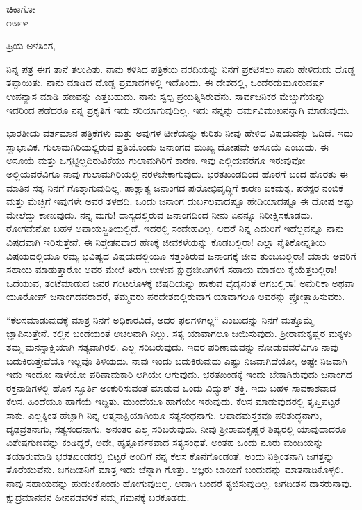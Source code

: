 \vspace{-0.5cm}

\begin{flushright}
ಚಿಕಾಗೋ\\೧೮೯೪
\end{flushright}

\noindent
ಪ್ರಿಯ ಅಳಸಿಂಗ,

ನಿನ್ನ ಪತ್ರ ಈಗ ತಾನೆ ತಲುಪಿತು. ನಾನು ಕಳಿಸಿದ ಪತ್ರಿಕೆಯ ವರದಿಯನ್ನು ನಿನಗೆ ಪ್ರಕಟಿಸಲು ನಾನು ಹೇಳಿದುದು ದೊಡ್ಡ ತಪ್ಪಾಯಿತು. ನಾನು ಮಾಡಿದ ದೊಡ್ಡ ಪ್ರಮಾದಗಳಲ್ಲಿ ಇದೊಂದು. ಈ ದೇಶದಲ್ಲಿ, ಒಂದೆರಡು\enginline{-}ಮೂರುವರ್ಷ ಉಪನ್ಯಾಸ ಮಾಡಿ ಹಣವನ್ನು ಎತ್ತಬಹುದು. ನಾನು ಸ್ವಲ್ಪ ಪ್ರಯತ್ನಿಸಿರುವೆನು. ಸಾರ್ವಜನಿಕರ ಮೆಚ್ಚುಗೆಯನ್ನು ಇದರಿಂದ ಪಡೆದರೂ ನನ್ನ ಪ್ರಕೃತಿಗೆ ಇದು ಸರಿಯಾಗುವುದಿಲ್ಲ. ಇದು ನನ್ನನ್ನು ಧರ್ಮವಿಮುಖನನ್ನಾಗಿ ಮಾಡುವುದು.

ಭಾರತೀಯ ವರ್ತಮಾನ ಪತ್ರಿಕೆಗಳು ಮತ್ತು ಅವುಗಳ ಟೀಕೆಯನ್ನು ಕುರಿತು ನೀವು ಹೇಳಿದ ವಿಷಯವನ್ನು ಓದಿದೆ. ಇದು ಸ್ವಾಭಾವಿಕ. ಗುಲಾಮಗಿರಿಯಲ್ಲಿರುವ ಪ್ರತಿಯೊಂದು ಜನಾಂಗದ ಮುಖ್ಯ ದೋಷವೇ ಅಸೂಯೆ ಎಂಬುದು. ಈ ಅಸೂಯೆ ಮತ್ತು ಒಗ್ಗಟ್ಟಿಲ್ಲದಿರುವಿಕೆಯು ಗುಲಾಮಗಿರಿಗೆ ಕಾರಣ. ಇವು ಎಲ್ಲಿಯವರೆಗೂ ಇರುವುವೋ ಅಲ್ಲಿಯವರೆವಿಗೂ ನಾವು ಗುಲಾಮಗಿರಿಯಲ್ಲಿ ನರಳಬೇಕಾಗುವುದು. ಭರತಖಂಡದಿಂದ ಹೊರಗೆ ಬಂದ ಹೊರತು ಈ ಮಾತಿನ ಸತ್ಯ ನಿನಗೆ ಗೊತ್ತಾಗುವುದಿಲ್ಲ. ಪಾಶ್ಚಾತ್ಯ ಜನಾಂಗದ ಪುರೋಭಿವೃದ್ಧಿಗೆ ಕಾರಣ ಐಕಮತ್ಯ. ಪರಸ್ಪರ ನಂಬಿಕೆ ಮತ್ತು ಮೆಚ್ಚಿಗೆ ಇವುಗಳೇ ಅವರ ತಳಹದಿ. ಒಂದು ಜನಾಂಗ ದುರ್ಬಲವಾದಷ್ಟೂ ಹೇಡಿಯಾದಷ್ಟೂ ಈ ದೋಷ ಅಷ್ಟು ಮೇಲೆದ್ದು ಕಾಣುವುದು. ನನ್ನ ಮಗು! ದಾಸ್ಯದಲ್ಲಿರುವ ಜನಾಂಗದಿಂದ ನೀನು ಏನನ್ನೂ ನಿರೀಕ್ಷಿಸಕೂಡದು. ರೋಗವೇನೋ ಬಹಳ ಅಪಾಯಸ್ಥಿತಿಯಲ್ಲಿದೆ. ಇದರಲ್ಲಿ ಸಂದೇಹವಿಲ್ಲ. ಆದರೆ ನಿನ್ನ ಎದುರಿಗೆ ಇದೆಲ್ಲವನ್ನೂ ನಾನು ವಿಷದವಾಗಿ ಇರಿಸುತ್ತೇನೆ. ಈ ನಿಶ್ಚೇತನವಾದ ಹೆಣಕ್ಕೆ ಜೀವಕಳೆಯನ್ನು ಕೊಡಬಲ್ಲಿರಾ! ಎಲ್ಲಾ ನೈತಿಕೋನ್ನತಿಯ ವಿಷಯದಲ್ಲಿಯೂ ರಮ್ಯ ಭವಿಷ್ಯದ ವಿಷಯದಲ್ಲಿಯೂ ಸತ್ತಂತಿರುವ ಜನಾಂಗಕ್ಕೆ ಜೀವ ತುಂಬಬಲ್ಲಿರಾ! ಯಾರು ಅವರಿಗೆ ಸಹಾಯ ಮಾಡುತ್ತಾರೋ ಅವರ ಮೇಲೆ ತಿರುಗಿ ಬೀಳುವ ಕ್ಷುದ್ರಜೀವಿಗಳಿಗೆ ಸಹಾಯ ಮಾಡಲು ಕೈಯೆತ್ತಬಲ್ಲಿರಾ! ಒದೆಯುವ, ತಂಟೆಮಾಡುವ ಜನರ ಗಂಟಲೊಳಕ್ಕೆ ಔಷಧಿಯನ್ನು ಹಾಕುವ ವೈದ್ಯನಂತೆ ಆಗಬಲ್ಲಿರಾ! ಅಮೆರಿಕಾ ಅಥವಾ ಯೂರೋಪ್ ಜನಾಂಗದವರಾದರೆ, ತಮ್ಮವರು ಪರದೇಶದಲ್ಲಿರುವಾಗ ಯಾವಾಗಲೂ ಅವರನ್ನು ಪ್ರೋತ್ಸಾಹಿಸುವರು.

“ಕೆಲಸಮಾಡುವುದಕ್ಕೆ ಮಾತ್ರ ನಿನಗೆ ಅಧಿಕಾರವಿದೆ, ಅದರ ಫಲಗಳಿಗಲ್ಲ“ ಎಂಬುದನ್ನು ನಿನಗೆ ಮತ್ತೊಮ್ಮೆ ಜ್ಞಾಪಿಸುತ್ತೇನೆ. ಕಲ್ಲಿನ ಬಂಡೆಯಂತೆ ಅಚಲನಾಗಿ ನಿಲ್ಲು. ಸತ್ಯ ಯಾವಾಗಲೂ ಜಯಿಸುವುದು. ಶ‍್ರೀರಾಮಕೃಷ್ಣರ ಮಕ್ಕಳು ತಮ್ಮ ಮನಸ್ಸಾಕ್ಷಿಯಾಗಿ ಸತ್ಯವಾಗಿರಲಿ. ಎಲ್ಲ ಸರಿಬರುವುದು. ಇದರ ಪರಿಣಾಮವನ್ನು ನೋಡುವವರೆವಿಗೂ ನಾವು ಬದುಕಿರುತ್ತೇವೆಯೊ ಇಲ್ಲವೊ ತಿಳಿಯದು. ನಾವು ಇಂದು ಬದುಕಿರುವುದು ಎಷ್ಟು ನಿಜವಾಗಿದೆಯೋ, ಅಷ್ಟೇ ನಿಜವಾಗಿ ಇದು ಇಂದೋ ನಾಳೆಯೋ ಪರಿಣಾಮಕಾರಿ ಆಗಿಯೇ ಆಗುವುದು. ಭರತಖಂಡಕ್ಕೆ ಇಂದು ಬೇಕಾಗಿರುವುದು ಜನಾಂಗದ ರಕ್ತನಾಡಿಗಳಲ್ಲಿ ಹೊಸ ಸ್ಫೂರ್ತಿ ಅಂಕುರಿಸುವಂತೆ ಮಾಡುವ ಒಂದು ವಿದ್ಯುತ್ ಶಕ್ತಿ. ಇದು ಬಹಳ ಸಾವಕಾಶವಾದ ಕೆಲಸ. ಹಿಂದೆಯೂ ಹಾಗೆಯೆ ಇದ್ದಿತು. ಮುಂದೆಯೂ ಹಾಗೆಯೇ ಇರುವುದು. ಕೆಲಸ ಮಾಡುವುದರಲ್ಲಿ ತೃಪ್ತಿಪಟ್ಟರೆ ಸಾಕು. ಎಲ್ಲಕ್ಕಿಂತ ಹೆಚ್ಚಾಗಿ ನಿನ್ನ ಆತ್ಮಸಾಕ್ಷಿಯಾಗಿಯೂ ಸತ್ಯಸಂಧನಾಗು. ಆಪಾದಮಸ್ತಕವೂ ಪರಿಶುದ್ಧನಾಗು, ದೃಢವ್ರತನಾಗು, ಸತ್ಯಸಂಧನಾಗು. ಅನಂತರ ಎಲ್ಲ ಸರಿಬರುವುದು. ನೀವು ಶ‍್ರೀರಾಮಕೃಷ್ಣರ ಶಿಷ್ಯರಲ್ಲಿ ಯಾವುದಾದರೂ ವಿಶೇಷಗುಣವನ್ನು ಕಂಡಿದ್ದರೆ, ಅದೇ, ಹೃತ್ಪೂರ್ವಕವಾದ ಸತ್ಯಸಂಧತೆ. ಅಂತಹ ಒಂದು ನೂರು ಮಂದಿಯನ್ನು ತಯಾರುಮಾಡಿ ಭರತಖಂಡದಲ್ಲಿ ಬಿಟ್ಟರೆ ಅಂದಿಗೆ ನನ್ನ ಕೆಲಸ ಕೊನೆಗೊಂಡಂತೆ. ಅಂದು ನಿಶ್ಚಿಂತನಾಗಿ ಜಗತ್ತನ್ನು ತೊರೆಯುವೆನು. ಜಗದೀಶನಿಗೆ ಮಾತ್ರ ಇದು ಚೆನ್ನಾಗಿ ಗೊತ್ತು. ಅಜ್ಞರು ಬಾಯಿಗೆ ಬಂದುದನ್ನು ಮಾತನಾಡಿಕೊಳ್ಳಲಿ. ನಾವು ಸಹಾಯವನ್ನು ಹುಡುಕಿಕೊಂಡು ಹೋಗುವುದಿಲ್ಲ. ಅದಾಗಿ ಬಂದರೆ ತ್ಯಜಿಸುವುದಿಲ್ಲ. ಜಗದೀಶನ ದಾಸರುನಾವು. ಕ್ಷುದ್ರಮಾನವನ ಹೀನನಡವಳಿಕೆ ನಮ್ಮ ಗಮನಕ್ಕೆ ಬರಕೂಡದು.

